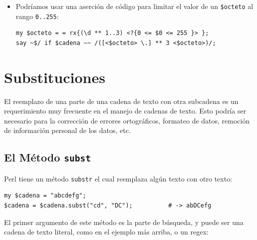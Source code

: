 \begin{itemize}
\begin{lstlisting}
my $octeto = rx { (   25 <[0..5]>       # 250 a 255
                   || 2  <[0..4]> \d     # 200 a 249
                   || 1  \d ** 2         # 100 a 199
                   || \d ** 1..2         # 0 a 99 
                 )
               };
say ~$/ if $cadena ~~ /([<$octeto> \.] ** 3 <$octeto>)/;
\end{lstlisting}
%

Esta definición de \verb|$octeto| ilustra una vez más cómo
el uso abundante de espacios en blanco y comentarios ayudan
a hacer la intención más clara.

\item Podríamos usar una aserción de código para limitar el
valor de un \verb|$octeto| al rango \verb|0..255|:

\begin{lstlisting}
my $octeto = = rx{(\d ** 1..3) <?{0 <= $0 <= 255 }> };
say ~$/ if $cadena ~~ /([<$octeto> \.] ** 3 <$octeto>)/;
\end{lstlisting}
%

\end{itemize}


\section{Substituciones}
\label{substitutions}

El reemplazo de una parte de una cadena de texto con otra 
subcadena es un requerimiento muy frecuente en el manejo
de cadenas de texto. Esto podría ser necesario para la
corrección de errores ortográficos, formateo de datos, 
remoción de información personal de los datos, etc.

\subsection{El Método {\tt subst}}

Perl tiene un método {\tt substr} el cual reemplaza algún
texto con otro texto:

\begin{lstlisting}
my $cadena = "abcdefg";
$cadena = $cadena.subst("cd", "DC");          # -> abDCefg
\end{lstlisting}

El primer argumento de este método es la parte de búsqueda, 
y puede ser una cadena de texto literal, como en el ejemplo
más arriba, o un regex:

